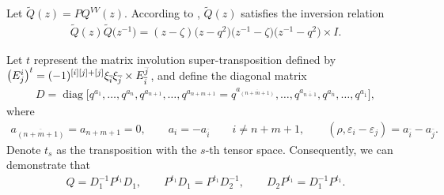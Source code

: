 \documentclass[10pt,a4paper]{amsart}
\numberwithin{equation}{section}
\begin{document}
\begin{Remark}
Let $\widetilde{Q}(z)=PQ^{VV}(z)$. According to \cite{WGMJ}, $\widetilde{Q}(z)$ satisfies the inversion relation
\begin{gather*}
 \widetilde{Q}(z)\widetilde{Q}\bigl(z^{-1}\bigr)=(z-\zeta)\bigl(z-q^2\bigr)\bigl(z^{-1}-\zeta\bigr)\bigl(z^{-1}-q^2\bigr)\times I.
\end{gather*}
\end{Remark}



Let $t$ represent the matrix involution super-transposition defined by
$
\bigl(E_j^i\bigr)^t=(-1)^{[i][j]+[j]}\xi_{\overline{i}}\xi_{\overline{j}}\allowbreak\times\smash{ E_{\overline{i}}^{\overline{j}}}$,
 and define the diagonal matrix
 \begin{gather*}
 D=\operatorname{diag}\bigl[q^{a_1},\dots,q^{a_n},q^{a_{n+1}},\dots, q^{a_{n+m+1}}=q^{a_{\overline{(n+m+1)}}},\dots,
 q^{a_{\overline{n+1}}},q^{a_{\overline{n}}},\dots,q^{a_{\overline{1}}}\bigr],
 \end{gather*}
 where
\begin{gather*}
 a_{\overline{(n+m+1)}}=a_{n+m+1}=0,\qquad a_i=-a_{\overline{i}} \qquad i\neq n+m+1,\qquad (\rho, \varepsilon_i-\varepsilon_j)=a_{\bar{i}}-a_{\bar{j}}.
\end{gather*}
Denote $t_s$ as the transposition with the $s$-th tensor space.
Consequently, we can demonstrate that
\begin{gather}\label{d5}
 Q=D_1^{-1}P^{t_1}D_1, \qquad P^{t_1}D_1=P^{t_1}D_2^{-1}, \qquad D_2P^{t_1}=D_1^{-1}P^{t_1}.
\end{gather}
\end{document}

